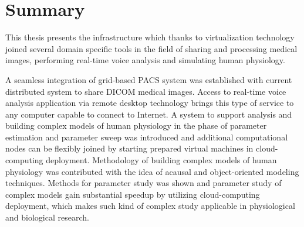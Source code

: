 


\section{Summary}

This thesis presents the infrastructure which thanks to virtualization technology joined several domain specific tools in the field of sharing and processing medical images, performing real-time voice analysis and simulating human physiology.  

A seamless integration of grid-based PACS system was established with current distributed system to share DICOM medical images. Access to real-time voice analysis application via remote desktop technology brings this type of service to any computer capable to connect to Internet. A system to support analysis and building complex models of human physiology in the phase of parameter estimation and parameter sweep was introduced and additional computational nodes can be flexibly joined by starting prepared virtual machines in cloud-computing deployment. Methodology of building complex models of human physiology was contributed with the idea of acausal and object-oriented modeling techniques. Methods for parameter study was shown and parameter study of complex models gain substantial speedup by utilizing cloud-computing deployment, which makes such kind of complex study applicable in physiological and biological research.
